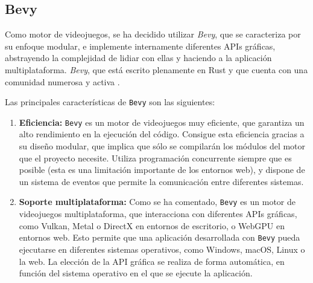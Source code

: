 
\subsection{Bevy} \label{subsec:bevy}
Como motor de videojuegos, se ha decidido utilizar \textit{Bevy}, que se caracteriza por su enfoque modular, e implemente internamente diferentes APIs gráficas, abstrayendo la complejidad de lidiar con ellas y haciendo a la aplicación multiplataforma. \textit{Bevy}, que está escrito plenamente en Rust y que cuenta con una comunidad numerosa y activa \autocite{BevyEngine}.

Las principales características de \texttt{Bevy} son las siguientes:
\begin{enumerate}
    \item \textbf{Eficiencia:} \texttt{Bevy} es un motor de videojuegos muy eficiente, que garantiza un alto rendimiento en la ejecución del código. Consigue esta eficiencia gracias a su diseño modular, que implica que sólo se compilarán los módulos del motor que el proyecto necesite. Utiliza programación concurrente siempre que es posible (esta es una limitación importante de los entornos web), y dispone de un sistema de eventos que permite la comunicación entre diferentes sistemas.
    \item \textbf{Soporte multiplataforma:} Como se ha comentado, \texttt{Bevy} es un motor de videojuegos multiplataforma, que interacciona con diferentes APIs gráficas, como Vulkan, Metal o DirectX en entornos de escritorio, o WebGPU en entornos web. Esto permite que una aplicación desarrollada con \texttt{Bevy} pueda ejecutarse en diferentes sistemas operativos, como Windows, macOS, Linux o la web. La elección de la API gráfica se realiza de forma automática, en función del sistema operativo en el que se ejecute la aplicación.
\end{enumerate}

